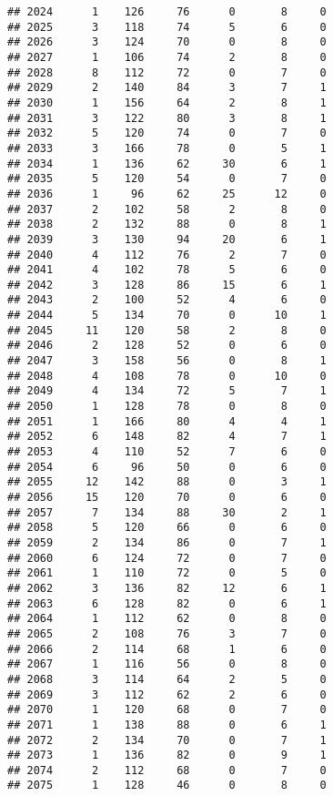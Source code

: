 \documentclass[
]{article}
\begin{document}
\begin{verbatim}
## 2024      1    126     76      0       8     0
## 2025      3    118     74      5       6     0
## 2026      3    124     70      0       8     0
## 2027      1    106     74      2       8     0
## 2028      8    112     72      0       7     0
## 2029      2    140     84      3       7     1
## 2030      1    156     64      2       8     1
## 2031      3    122     80      3       8     1
## 2032      5    120     74      0       7     0
## 2033      3    166     78      0       5     1
## 2034      1    136     62     30       6     1
## 2035      5    120     54      0       7     0
## 2036      1     96     62     25      12     0
## 2037      2    102     58      2       8     0
## 2038      2    132     88      0       8     1
## 2039      3    130     94     20       6     1
## 2040      4    112     76      2       7     0
## 2041      4    102     78      5       6     0
## 2042      3    128     86     15       6     1
## 2043      2    100     52      4       6     0
## 2044      5    134     70      0      10     1
## 2045     11    120     58      2       8     0
## 2046      2    128     52      0       6     0
## 2047      3    158     56      0       8     1
## 2048      4    108     78      0      10     0
## 2049      4    134     72      5       7     1
## 2050      1    128     78      0       8     0
## 2051      1    166     80      4       4     1
## 2052      6    148     82      4       7     1
## 2053      4    110     52      7       6     0
## 2054      6     96     50      0       6     0
## 2055     12    142     88      0       3     1
## 2056     15    120     70      0       6     0
## 2057      7    134     88     30       2     1
## 2058      5    120     66      0       6     0
## 2059      2    134     86      0       7     1
## 2060      6    124     72      0       7     0
## 2061      1    110     72      0       5     0
## 2062      3    136     82     12       6     1
## 2063      6    128     82      0       6     1
## 2064      1    112     62      0       8     0
## 2065      2    108     76      3       7     0
## 2066      2    114     68      1       6     0
## 2067      1    116     56      0       8     0
## 2068      3    114     64      2       5     0
## 2069      3    112     62      2       6     0
## 2070      1    120     68      0       7     0
## 2071      1    138     88      0       6     1
## 2072      2    134     70      0       7     1
## 2073      1    136     82      0       9     1
## 2074      2    112     68      0       7     0
## 2075      1    128     46      0       8     0

\end{verbatim}
\end{document}
